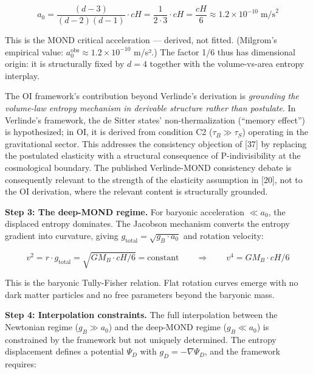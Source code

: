 \documentclass[
]{article}
\begin{document}
\[a_0 = \frac{(d-3)}{(d-2)(d-1)} \cdot cH = \frac{1}{2 \cdot 3} \cdot cH = \frac{cH}{6} \approx 1.2 \times 10^{-10} \; \text{m/s}^2\]

This is the MOND critical acceleration --- derived, not fitted.
(Milgrom's empirical value:
\(a_0^{\text{obs}} \approx 1.2 \times 10^{-10}\) m/s².) The factor 1/6
thus has dimensional origin: it is structurally fixed by \(d = 4\)
together with the volume-vs-area entropy interplay.

The OI framework's contribution beyond Verlinde's derivation is
\emph{grounding the volume-law entropy mechanism in derivable structure
rather than postulate}. In Verlinde's framework, the de Sitter states'
non-thermalization (``memory effect'') is hypothesized; in OI, it is
derived from condition C2 (\(\tau_B \gg \tau_S\)) operating in the
gravitational sector. This addresses the consistency objection of
{[}37{]} by replacing the postulated elasticity with a structural
consequence of P-indivisibility at the cosmological boundary. The
published Verlinde-MOND consistency debate is consequently relevant to
the strength of the elasticity assumption in {[}20{]}, not to the OI
derivation, where the relevant content is structurally grounded.

\textbf{Step 3: The deep-MOND regime.} For baryonic acceleration
\(\ll a_0\), the displaced entropy dominates. The Jacobson mechanism
converts the entropy gradient into curvature, giving
\(g_{\text{total}} = \sqrt{g_B \cdot a_0}\) and rotation velocity:

\[v^2 = r \cdot g_{\text{total}} = \sqrt{GM_B \cdot cH/6} = \text{constant} \qquad \Longrightarrow \qquad v^4 = GM_B \cdot cH/6\]

This is the baryonic Tully-Fisher relation. Flat rotation curves emerge
with no dark matter particles and no free parameters beyond the baryonic
mass.

\textbf{Step 4: Interpolation constraints.} The full interpolation
between the Newtonian regime (\(g_B \gg a_0\)) and the deep-MOND regime
(\(g_B \ll a_0\)) is constrained by the framework but not uniquely
determined. The entropy displacement defines a potential \(\Psi_D\) with
\(g_D = -\nabla \Psi_D\), and the framework requires:
\end{document}

